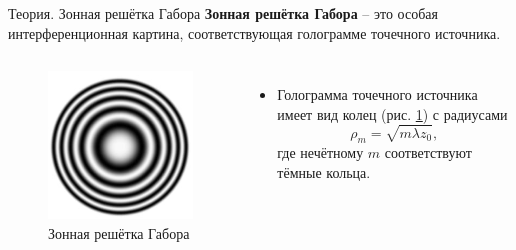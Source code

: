 \documentclass[11pt]{beamer} %
\begin{document}
   \begin{frame}{Теория. Зонная решётка Габора}
        \textbf{Зонная решётка Габора} -- это особая интерференционная картина, соответствующая голограмме точечного источника.
        \begin{columns}
                \begin{figure}[H]
                    \centering
                    \includegraphics[width = \textwidth]{images/Gabor_grating.jpg}
                    \caption{Зонная решётка Габора}
                    \label{fig:Gabor}
                \end{figure}
            
                \begin{itemize}
                   \item Голограмма точечного источника имеет вид колец (рис. \ref{fig:Gabor}) с радиусами
                    \begin{equation*}\label{key}
                    	\rho_m = \sqrt{m \lambda z_0},
                    \end{equation*}
                    где нечётному $ m $ соответствуют тёмные кольца.  
               \end{itemize}
        \end{columns}
   \end{frame}
\end{document}
